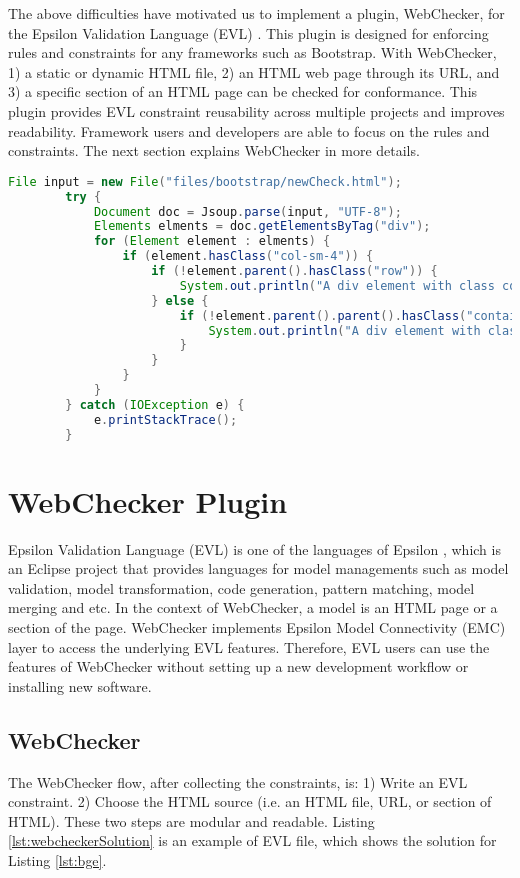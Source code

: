 \documentclass[conference]{IEEETran}
\begin{document}
The above difficulties have motivated us to implement a plugin, WebChecker, for the Epsilon Validation Language (EVL) \cite{Kolovos2009}.  This plugin is designed for enforcing rules and constraints for any frameworks such as Bootstrap. With WebChecker, 1) a static or dynamic HTML file, 2) an HTML web page through its URL, and 3) a specific section of an HTML page can be checked for conformance. This plugin provides EVL constraint reusability across multiple projects and improves readability. Framework users and developers are able to focus on the rules and constraints. The next section explains WebChecker in more details.    

\begin{lstlisting}[language=Java, caption=Enforcing Bootstrap Grid Rule, label={lst:ebgr}]
		File input = new File("files/bootstrap/newCheck.html");
		try {
			Document doc = Jsoup.parse(input, "UTF-8");
			Elements elments = doc.getElementsByTag("div");
			for (Element element : elments) {
				if (element.hasClass("col-sm-4")) {					
					if (!element.parent().hasClass("row")) {
						System.out.println("A div element with class col should have a parent element with class row");
					} else {
						if (!element.parent().parent().hasClass("container")) {
							System.out.println("A div element with class col should have a parent element with class row, which has a parent with class container.");
						}
					}
				}
			}		
		} catch (IOException e) {
			e.printStackTrace();
		}
\end{lstlisting}


\section{WebChecker Plugin}
Epsilon Validation Language (EVL) \cite{Kolovos2009} is one of the languages of Epsilon \cite{EpsilonProject}, which is an Eclipse project that provides languages for model managements such as model validation, model transformation, code generation, pattern matching, model merging and etc. In the context of WebChecker, a model is an HTML page or a section of the page. WebChecker implements Epsilon Model Connectivity (EMC) layer to access the underlying EVL features. Therefore, EVL users can use the features of WebChecker without setting up a new development workflow or installing new software.      

\subsection{WebChecker}
The WebChecker flow, after collecting the constraints, is: 
1) Write an EVL constraint.
2) Choose the HTML source (i.e. an HTML file, URL, or section of HTML).
These two steps are modular and readable. Listing \ref{lst:webcheckerSolution} is an example of EVL file, which shows the solution for Listing \ref{lst:bge}. 
\end{document}
